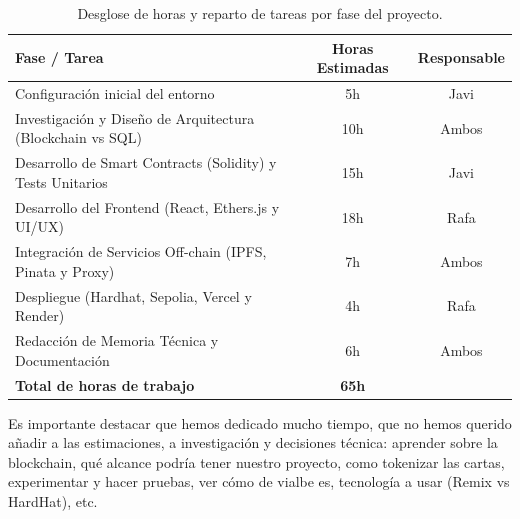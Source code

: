 \begin{table}[H]
	\centering
	\begin{tabular}{|l|c|c|}
		\hline
		\textbf{Fase / Tarea} & \textbf{Horas Estimadas} & \textbf{Responsable} \\ \hline
		Configuración inicial del entorno & 5h & Javi \\ \hline
		Investigación y Diseño de Arquitectura (Blockchain vs SQL) & 10h & Ambos \\ \hline
		Desarrollo de Smart Contracts (Solidity) y Tests Unitarios & 15h & Javi \\ \hline
		Desarrollo del Frontend (React, Ethers.js y UI/UX) & 18h & Rafa \\ \hline
		Integración de Servicios Off-chain (IPFS, Pinata y Proxy) & 7h & Ambos \\ \hline
		Despliegue (Hardhat, Sepolia, Vercel y Render) & 4h & Rafa \\ \hline
		Redacción de Memoria Técnica y Documentación & 6h & Ambos \\ \hline
		\textbf{Total de horas de trabajo} & \textbf{65h} & \\ \hline
	\end{tabular}
	\caption{Desglose de horas y reparto de tareas por fase del proyecto.}
	\label{tab:planificacion}
\end{table}

Es importante destacar que hemos dedicado mucho tiempo, que no hemos querido añadir a las estimaciones, a investigación y decisiones técnica: aprender sobre la blockchain, qué alcance podría tener nuestro proyecto, como tokenizar las cartas, experimentar y hacer pruebas, ver cómo de vialbe es, tecnología a usar (Remix vs HardHat), etc. 